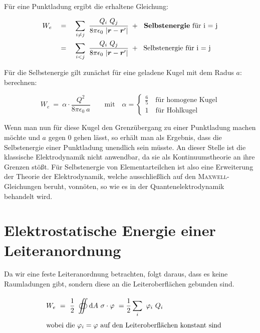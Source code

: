 \ \\
Für eine Punktladung ergibt die erhaltene Gleichung: 

\begin{align*}
W_e \quad &= \quad \sum_{i\neq j} \ \frac{Q_i \ Q_j}{8\pi\epsilon_0 \ |\vec{r}-\vec{r}'|} \; + \; \text{\textbf{ Selbstenergie} für i = j}\\
&= \quad \sum_{i<j} \ \frac{Q_i \ Q_j}{8\pi\epsilon_0 \ |\vec{r}-\vec{r}'|} \; + \; \text{ Selbstenergie für i = j}\\
\end{align*}

Für die Selbstenergie gilt zunächst für eine geladene Kugel mit dem Radus $a$: berechnen:

\begin{equation*}
W_e \ = \ \alpha \cdot \frac{Q^2}{8\pi\epsilon_0 \ a} \qquad \text{mit} \quad \alpha = \begin{cases}
	\frac{6}{5} \quad \text{für homogene Kugel}\\
	1 \quad \text{für Hohlkugel}
  \end{cases}	
\end{equation*}	

Wenn man nun für diese Kugel den Grenzübergang zu einer Punktladung machen möchte und $a$ gegen 0 gehen lässt, so erhält man als Ergebnis, dass die Selbstenergie einer Punktladung unendlich sein müsste. An dieser Stelle ist die klassische Elektrodynamik nicht anwendbar, da sie als Kontinuumstheorie an ihre Grenzen stößt. Für Selbstenergie von Elementarteilchen ist also eine Erweiterung der Theorie der Elektrodynamik, welche ausschließlich auf den \textsc{Maxwell}-Gleichungen beruht, vonnöten, so wie es in der Quantenelektrodynamik behandelt wird.

\section{Elektrostatische Energie einer Leiteranordnung}

Da wir eine feste Leiteranordnung betrachten, folgt daraus, dass es keine Raumladungen gibt, sondern diese an die Leiteroberflächen gebunden sind.

\begin{align*}
& \quad W_e \ = \ \frac{1}{2} \ \oiint\limits_{{}}^{{}}\mathrm{d}{A}\  \sigma\cdot\varphi \  =  \frac{1}{2} \sum_i \ \varphi_i \ Q_i\\
&\quad \text{wobei die }\varphi_i = \varphi \text{ auf den Leiteroberflächen konstant sind}
\end{align*}


